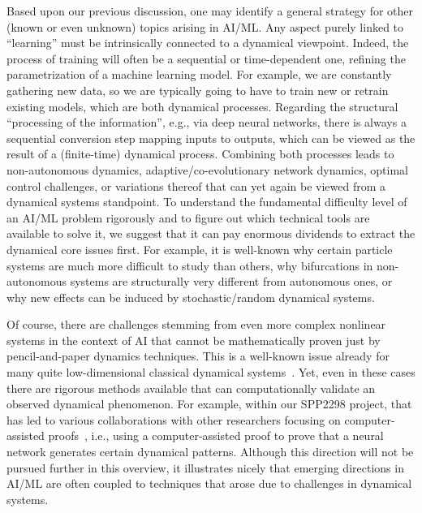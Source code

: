 \documentclass[10pt]{article}
\begin{document}
Based upon our previous discussion, one may identify a general strategy for other (known or even unknown) topics arising in AI/ML. Any aspect purely linked to ``learning'' must be intrinsically connected to a dynamical viewpoint. Indeed, the process of training will often be a sequential or time-dependent one, refining the parametrization of a machine learning model. For example, we are constantly gathering new data, so we are typically going to have to train new or retrain existing models, which are both dynamical processes. Regarding the structural ``processing of the information'', e.g., via deep neural networks, there is always a sequential conversion step mapping inputs to outputs, which can be viewed as the result of a (finite-time) dynamical process. Combining both processes leads to non-autonomous dynamics, adaptive/co-evolutionary network dynamics, optimal control challenges, or variations thereof that can yet again be viewed from a dynamical systems standpoint. To understand the fundamental difficulty level of an AI/ML problem rigorously and to figure out which technical tools are available to solve it, we suggest that it can pay enormous dividends to extract the dynamical core issues first. For example, it is well-known why certain particle systems are much more difficult to study than others, why bifurcations in non-autonomous systems are structurally very different from autonomous ones, or why new effects can be induced by stochastic/random dynamical systems. 

Of course, there are challenges stemming from even more complex nonlinear systems in the context of AI that cannot be mathematically proven just by pencil-and-paper dynamics techniques. This is a well-known issue already for many quite low-dimensional classical dynamical systems~\cite{Tucker}. Yet, even in these cases there are rigorous methods available that can computationally validate an observed dynamical phenomenon. For example, within our SPP2298 project, that has led to various collaborations with other researchers focusing on computer-assisted proofs~\cite{KuehnQueirolo}, i.e., using a computer-assisted proof to prove that a neural network generates certain dynamical patterns. Although this direction will not be pursued further in this overview, it illustrates nicely that emerging directions in AI/ML are often coupled to techniques that arose due to challenges in dynamical systems. 

               
               
\end{document}
